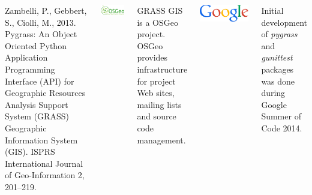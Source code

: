 \documentclass[innermargin=10mm]{tikzposter}
\newlength{\logowidth}
\newcommand{\pkg}[1]{\emph{#1}}
\begin{document}
\begin{columns}
{\begin{thebibliography}{9}
  Zambelli, P., Gebbert, S., Ciolli, M., 2013. Pygrass: An Object Oriented Python Application Programming
  Interface (API) for Geographic Resources Analysis Support System (GRASS) Geographic Information System
  (GIS). ISPRS International Journal of Geo-Information 2, 201--219.

\end{thebibliography}


\newcommand{\listhspace}{\hspace{0.005\linewidth}}
\newcommand{\listlogowidth}{0.15\linewidth}
\newcommand{\listtextwidth}{0.82\linewidth}

\begin{minipage}{\listlogowidth}
\includegraphics[width=\linewidth]{osgeo}
\end{minipage}
\listhspace
\begin{minipage}{\listtextwidth}
GRASS GIS is a OSGeo project. OSGeo provides infrastructure for project
Web sites, mailing lists and source code management.
\end{minipage}

\bigskip

\begin{minipage}{\listlogowidth}
\includegraphics[width=\linewidth]{google}
\end{minipage}
\listhspace
\begin{minipage}{\listtextwidth}
Initial development of \pkg{pygrass} and \pkg{gunittest} packages was done during Google Summer of Code 2014.
\end{minipage}

}
\end{columns}
\end{document}
